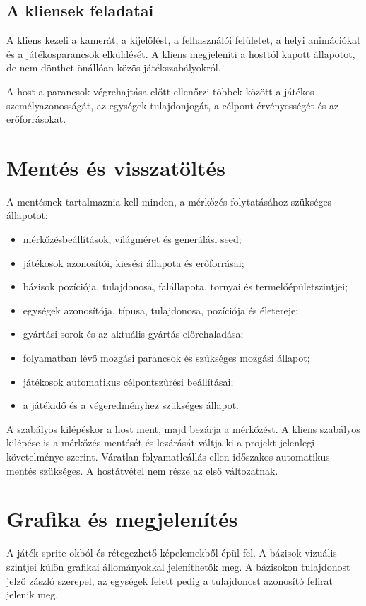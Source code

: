 \documentclass[12pt,a4paper]{article}
\begin{document}
\subsection{A kliensek feladatai}

A kliens kezeli a kamerát, a kijelölést, a felhasználói felületet, a helyi animációkat és a játékosparancsok elküldését. A kliens megjeleníti a hosttól kapott állapotot, de nem dönthet önállóan közös játékszabályokról.

A host a parancsok végrehajtása előtt ellenőrzi többek között a játékos személyazonosságát, az egységek tulajdonjogát, a célpont érvényességét és az erőforrásokat.

\section{Mentés és visszatöltés}

A mentésnek tartalmaznia kell minden, a mérkőzés folytatásához szükséges állapotot:
\begin{itemize}
  \item mérkőzésbeállítások, világméret és generálási seed;
  \item játékosok azonosítói, kiesési állapota és erőforrásai;
  \item bázisok pozíciója, tulajdonosa, falállapota, tornyai és termelőépületszintjei;
  \item egységek azonosítója, típusa, tulajdonosa, pozíciója és életereje;
  \item gyártási sorok és az aktuális gyártás előrehaladása;
  \item folyamatban lévő mozgási parancsok és szükséges mozgási állapot;
  \item játékosok automatikus célpontszűrési beállításai;
  \item a játékidő és a végeredményhez szükséges állapot.
\end{itemize}

A szabályos kilépéskor a host ment, majd bezárja a mérkőzést. A kliens szabályos kilépése is a mérkőzés mentését és lezárását váltja ki a projekt jelenlegi követelménye szerint. Váratlan folyamatleállás ellen időszakos automatikus mentés szükséges. A hostátvétel nem része az első változatnak.

\section{Grafika és megjelenítés}

A játék sprite-okból és rétegezhető képelemekből épül fel. A bázisok vizuális szintjei külön grafikai állományokkal jeleníthetők meg. A bázisokon tulajdonost jelző zászló szerepel, az egységek felett pedig a tulajdonost azonosító felirat jelenik meg.
\end{document}
